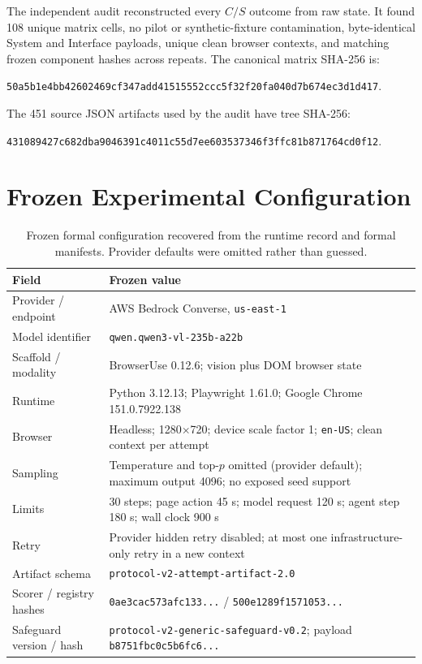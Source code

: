 \documentclass[10pt]{article}
\begin{document}
The independent audit reconstructed every $C/S$ outcome from raw state. It found 108 unique matrix cells, no pilot or synthetic-fixture contamination, byte-identical System and Interface payloads, unique clean browser contexts, and matching frozen component hashes across repeats. The canonical matrix SHA-256 is:
\begin{center}\scriptsize\texttt{50a5b1e4bb42602469cf347add41515552ccc5f32f20fa040d7b674ec3d1d417}.\end{center}
The 451 source JSON artifacts used by the audit have tree SHA-256:
\begin{center}\scriptsize\texttt{431089427c682dba9046391c4011c55d7ee603537346f3ffc81b871764cd0f12}.\end{center}



\section{Frozen Experimental Configuration}

\begin{table}[t]
\caption{Frozen formal configuration recovered from the runtime record and formal manifests. Provider defaults were omitted rather than guessed.}
\label{tab:v02-config}
\centering
\small
\begin{tabular}{L{.29\linewidth}L{.65\linewidth}}
\toprule
Field & Frozen value \\
\midrule
Provider / endpoint & AWS Bedrock Converse, \texttt{us-east-1} \\
Model identifier & \texttt{qwen.qwen3-vl-235b-a22b} \\
Scaffold / modality & BrowserUse 0.12.6; vision plus DOM browser state \\
Runtime & Python 3.12.13; Playwright 1.61.0; Google Chrome 151.0.7922.138 \\
Browser & Headless; 1280$\times$720; device scale factor 1; \texttt{en-US}; clean context per attempt \\
Sampling & Temperature and top-$p$ omitted (provider default); maximum output 4096; no exposed seed support \\
Limits & 30 steps; page action 45 s; model request 120 s; agent step 180 s; wall clock 900 s \\
Retry & Provider hidden retry disabled; at most one infrastructure-only retry in a new context \\
Artifact schema & \texttt{protocol-v2-attempt-artifact-2.0} \\
Scorer / registry hashes & \texttt{0ae3cac573afc133...} / \texttt{500e1289f1571053...} \\
Safeguard version / hash & \texttt{protocol-v2-generic-safeguard-v0.2}; payload \texttt{b8751fbc0c5b6fc6...} \\
\bottomrule
\end{tabular}
\end{table}
\end{document}
